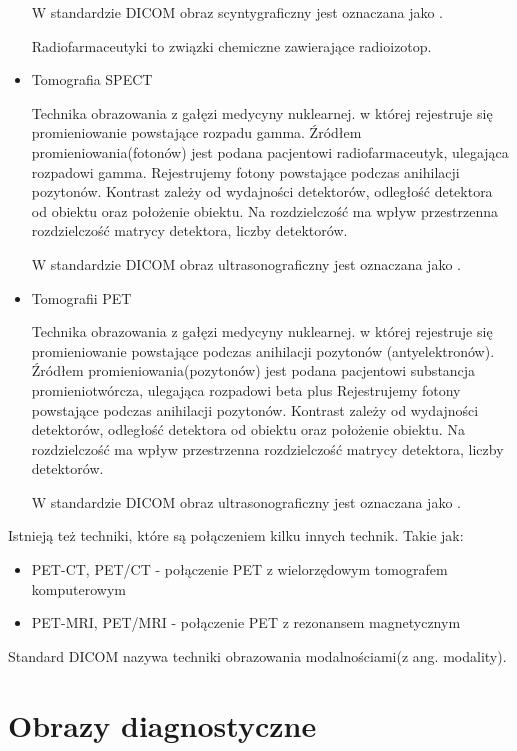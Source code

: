 \begin{itemize}
    W standardzie DICOM obraz scyntygraficzny jest oznaczana jako .

    Radiofarmaceutyki to związki chemiczne zawierające radioizotop.

    \item Tomografia SPECT
    
    Technika obrazowania  z gałęzi medycyny nuklearnej. w której rejestruje się promieniowanie powstające rozpadu gamma.
    Źródłem promieniowania(fotonów) jest podana pacjentowi radiofarmaceutyk, ulegająca rozpadowi gamma.
    Rejestrujemy fotony powstające podczas anihilacji pozytonów.
    Kontrast zależy od wydajności detektorów, odległość detektora od obiektu oraz położenie obiektu.
    Na rozdzielczość ma wpływ przestrzenna rozdzielczość matrycy detektora, liczby detektorów.

    W standardzie DICOM obraz ultrasonograficzny jest oznaczana jako .

    \item Tomografii PET
    
    Technika obrazowania  z gałęzi medycyny nuklearnej. w której rejestruje się promieniowanie powstające podczas anihilacji pozytonów (antyelektronów).
    Źródłem promieniowania(pozytonów) jest podana pacjentowi substancja promieniotwórcza, ulegająca rozpadowi beta plus
    Rejestrujemy fotony powstające podczas anihilacji pozytonów.
    Kontrast zależy od wydajności detektorów, odległość detektora od obiektu oraz położenie obiektu.
    Na rozdzielczość ma wpływ przestrzenna rozdzielczość matrycy detektora, liczby detektorów.

    W standardzie DICOM obraz ultrasonograficzny jest oznaczana jako .
    
\end{itemize}

Istnieją też techniki, które są połączeniem kilku innych technik.
Takie jak:
\begin{itemize}
    \item PET-CT, PET/CT - połączenie PET z wielorzędowym tomografem komputerowym
    \item PET-MRI, PET/MRI - połączenie PET z rezonansem magnetycznym
\end{itemize}

Standard DICOM nazywa techniki obrazowania modalnościami(z ang. modality).

\section{Obrazy diagnostyczne}

